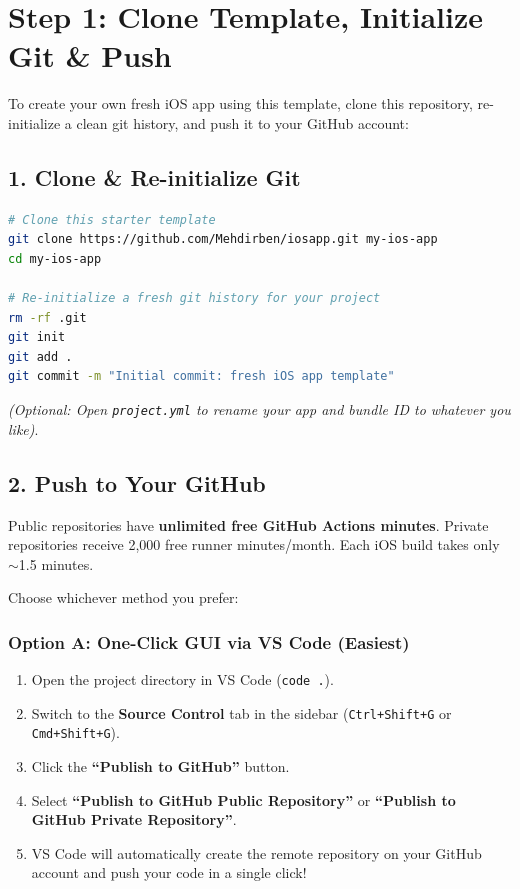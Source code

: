 \documentclass[11pt,a4paper]{article}
\begin{document}
{}
\section*{Step 1: Clone Template, Initialize Git \& Push}

To create your own fresh iOS app using this template, clone this repository, re-initialize a clean git history, and push it to your GitHub account:

\subsection*{1. Clone \& Re-initialize Git}
\begin{lstlisting}[language=bash]
# Clone this starter template
git clone https://github.com/Mehdirben/iosapp.git my-ios-app
cd my-ios-app

# Re-initialize a fresh git history for your project
rm -rf .git
git init
git add .
git commit -m "Initial commit: fresh iOS app template"
\end{lstlisting}

\textit{(Optional: Open \texttt{project.yml} to rename your app and bundle ID to whatever you like)}.

\subsection*{2. Push to Your GitHub}

\begin{notebox}
Public repositories have \textbf{unlimited free GitHub Actions minutes}. Private repositories receive 2,000 free runner minutes/month. Each iOS build takes only $\sim$1.5 minutes.
\end{notebox}

Choose whichever method you prefer:

\subsubsection*{Option A: One-Click GUI via VS Code (Easiest)}
\begin{enumerate}
    \item Open the project directory in VS Code (\texttt{code .}).
    \item Switch to the \textbf{Source Control} tab in the sidebar (\texttt{Ctrl+Shift+G} or \texttt{Cmd+Shift+G}).
    \item Click the \textbf{``Publish to GitHub''} button.
    \item Select \textbf{``Publish to GitHub Public Repository''} or \textbf{``Publish to GitHub Private Repository''}.
    \item VS Code will automatically create the remote repository on your GitHub account and push your code in a single click!
\end{enumerate}
\end{document}
